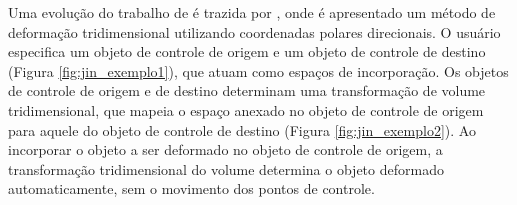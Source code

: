 Uma evolução do trabalho de  é trazida por , onde é apresentado um método de deformação tridimensional utilizando coordenadas polares direcionais. O usuário especifica um objeto de controle de origem e um objeto de controle de destino (Figura \ref{fig:jin_exemplo1}), que atuam como espaços de incorporação. Os objetos de controle de origem e de destino determinam uma transformação de volume tridimensional, que mapeia o espaço anexado no objeto de controle de origem para aquele do objeto de controle de destino (Figura \ref{fig:jin_exemplo2}). Ao incorporar o objeto a ser deformado no objeto de controle de origem, a transformação tridimensional do volume determina o objeto deformado automaticamente, sem o movimento dos pontos de controle.

\begin{figure}[h!]
	\centering
	\captionsetup{width=15cm}
	{}	
\end{figure}

\begin{figure}[h!]
	\centering
	\captionsetup{width=15cm}
	{}	
\end{figure}

